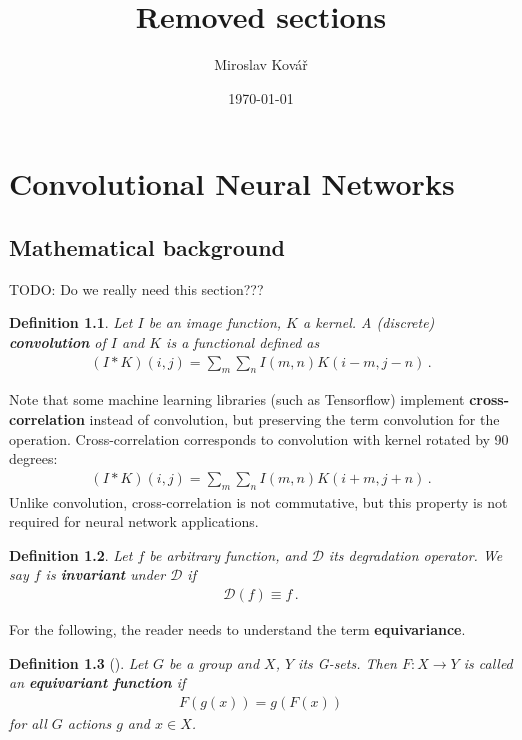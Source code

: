 \documentclass[11pt,czech,american,dvipsnames]{book}
\newtheorem{dfn}{Definition}
\begin{document}
\title{Removed sections}
\author{Miroslav Kovář}
\date{\today}
\maketitle

\chapter{Convolutional Neural Networks}

\section{Mathematical background}
TODO: Do we really need this section???

\begin{dfn}
  Let $I$ be an image function, $K$ a kernel. A (discrete) \textbf{convolution} of $I$ and $K$ is a functional defined as
  \begin{align}
    (I*K)(i,j) = \sum_m \sum_n I(m,n) K(i-m, j-n) \, .
  \end{align}
\end{dfn}

Note that some machine learning libraries (such as Tensorflow) implement \textbf{cross-correlation} instead of convolution, but preserving the term convolution for the operation. Cross-correlation corresponds to convolution with kernel rotated by 90 degrees:
\begin{align}
  (I*K)(i,j) = \sum_m \sum_n I(m,n) K(i+m, j+n) \, .
\end{align}
Unlike convolution, cross-correlation is not commutative, but this property is not required for neural network applications.

\begin{dfn}
  Let $f$ be arbitrary function, and $\mathcal{D}$ its degradation operator. We say $f$ is \textbf{invariant} under $\mathcal{D}$ if
  \begin{align}
    \mathcal{D}(f) \equiv f \, .
  \end{align}
\end{dfn}

For the following, the reader needs to understand the term \textbf{equivariance}. 
\begin{dfn}[\cite{pitts2013}]
  Let $G$ be a group and $X$, $Y$ its G-sets. Then $F:X \rightarrow Y$ is called an \textbf{equivariant function} if
  \begin{align}
    F(g(x)) = g(F(x))
  \end{align}
  for all $G$ actions $g$ and $x \in X$.
\end{dfn}
\end{document}
